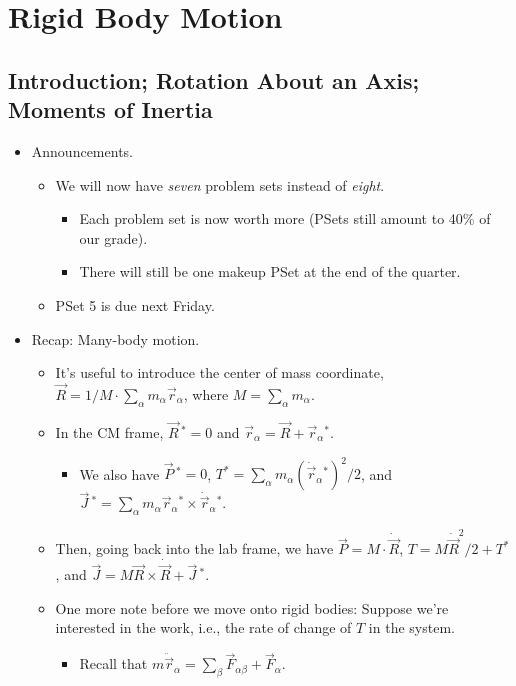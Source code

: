 \documentclass[../notes.tex]{subfiles}
\begin{document}
\chapter{Rigid Body Motion}
\section{Introduction; Rotation About an Axis; Moments of Inertia}
\begin{itemize}
    \item {}Announcements.
    \begin{itemize}
        \item We will now have \emph{seven} problem sets instead of \emph{eight}.
        \begin{itemize}
            \item Each problem set is now worth more (PSets still amount to 40\% of our grade).
            \item There will still be one makeup PSet at the end of the quarter.
        \end{itemize}
        \item PSet 5 is due next Friday.
    \end{itemize}
    \item Recap: Many-body motion.
    \begin{itemize}
        \item It's useful to introduce the center of mass coordinate, $\vec{R}=1/M\cdot\sum_\alpha m_\alpha\vec{r}_\alpha$, where $M=\sum_\alpha m_\alpha$.
        \item In the CM frame, $\vec{R}{\,}^*=0$ and $\vec{r}_\alpha=\vec{R}+\vec{r}_\alpha{}^*$.
        \begin{itemize}
            \item We also have $\vec{P}{\,}^*=0$, $T^*=\sum_\alpha m_\alpha(\dot{\vec{r}}_\alpha{}^*)^2/2$, and $\vec{J}{\,}^*=\sum_\alpha m_\alpha\vec{r}_\alpha{}^*\times\dot{\vec{r}}_\alpha{}^*$.
        \end{itemize}
        \item Then, going back into the lab frame, we have $\vec{P}=M\cdot\dot{\vec{R}}$, $T=M\dot{\vec{R}}^2/2+T^*$, and $\vec{J}=M\vec{R}\times\dot{\vec{R}}+\vec{J}{\,}^*$.
        \item One more note before we move onto rigid bodies: Suppose we're interested in the work, i.e., the rate of change of $T$ in the system.
        \begin{itemize}
            \item Recall that $m\ddot{\vec{r}}_\alpha=\sum_\beta\vec{F}_{\alpha\beta}+\vec{F}_\alpha$.

\end{itemize}
\end{itemize}
\end{itemize}
\end{document}
